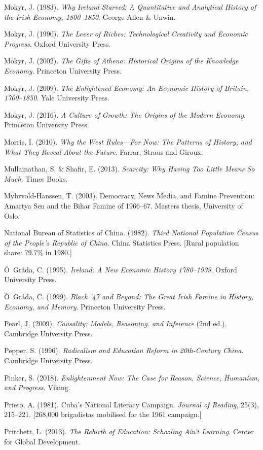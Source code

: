 \documentclass[12pt,letterpaper]{article}
\begin{document}
Mokyr, J. (1983). \emph{Why Ireland Starved: A Quantitative and
Analytical History of the Irish Economy, 1800--1850}. George Allen
\& Unwin.

Mokyr, J. (1990). \emph{The Lever of Riches: Technological Creativity
and Economic Progress}. Oxford University Press.

Mokyr, J. (2002). \emph{The Gifts of Athena: Historical Origins of the
Knowledge Economy}. Princeton University Press.

Mokyr, J. (2009). \emph{The Enlightened Economy: An Economic History
of Britain, 1700--1850}. Yale University Press.

Mokyr, J. (2016). \emph{A Culture of Growth: The Origins of the Modern
Economy}. Princeton University Press.

Morris, I. (2010). \emph{Why the West Rules---For Now: The Patterns of
History, and What They Reveal About the Future}. Farrar, Straus and
Giroux.

Mullainathan, S. \& Shafir, E. (2013). \emph{Scarcity: Why Having Too
Little Means So Much}. Times Books.

Myhrvold-Hanssen, T. (2003). Democracy, News Media, and Famine
Prevention: Amartya Sen and the Bihar Famine of 1966--67. Masters thesis,
University of Oslo.

National Bureau of Statistics of China. (1982). \emph{Third National
Population Census of the People's Republic of China}. China Statistics
Press. {[}Rural population share: 79.7\% in 1980.{]}

Ó~Gráda, C. (1995). \emph{Ireland: A New Economic History
1780--1939}. Oxford University Press.

Ó~Gráda, C. (1999). \emph{Black '47 and Beyond: The Great Irish
Famine in History, Economy, and Memory}. Princeton University Press.

Pearl, J. (2009). \emph{Causality: Models, Reasoning, and Inference}
(2nd ed.). Cambridge University Press.

Pepper, S. (1996). \emph{Radicalism and Education Reform in 20th-Century
China}. Cambridge University Press.

Pinker, S. (2018). \emph{Enlightenment Now: The Case for Reason, Science, Humanism, and Progress}. Viking.

Prieto, A. (1981). Cuba's National Literacy Campaign. \emph{Journal of
Reading}, 25(3), 215--221. {[}268,000 brigadistas mobilised for the 1961
campaign.{]}

Pritchett, L. (2013). \emph{The Rebirth of Education: Schooling Ain't
Learning}. Center for Global Development.
\end{document}
